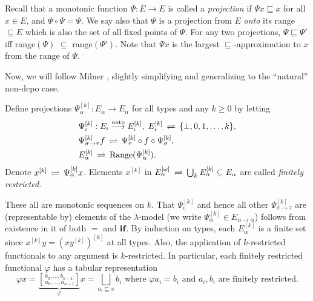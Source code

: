 \documentclass[fleqn]{LMCS}
\theoremstyle{plain}\newtheorem{satz}[thm]{Satz}
\theoremstyle{plain}\newtheorem{hyp}[thm]{Hypothesis}
\theoremstyle{plain}\newtheorem{hyps}[thm]{Hypotheses}
\theoremstyle{definition}\newtheorem{note}[thm]{Note}
\newcommand{\setof}[1]{\{#1\}}
\newcommand{\bYdef}{\mathrel{\BYDEF}}
\newcommand{\BYDEF}{\mbox{$\hspace{.2em}\rightleftharpoons\hspace{.2em}$}}
\newcommand{\arr}{\rightarrow}
\newcommand{\arrr}{\longrightarrow}
\newcommand{\IF}{\mbox{\bf if}}
\newcommand{\Undef}{{\perp}}
\newcommand{\?}{\mbox{?}}
\begin{document}
\bigskip

Recall that a monotonic function $\Psi:E\arr E$ 
is called a \emph{projection} 
if $\Psi x\sqsubseteq x$ for all $x\in E$, and  $\Psi\circ\Psi=\Psi$. 
We say also that $\Psi$ is a projection from $E$ \emph{onto} its range ${}\subseteq E$ 
which is also the set of all fixed points of $\Psi$. 
For any two projections, $\Psi\sqsubseteq\Psi'$ iff 
range$(\Psi)$ $\subseteq$ range$(\Psi')$. 
Note that 
$\Psi x$ is the largest $\sqsubseteq$-approximation to $x$ 
from the range of $\Psi$. 




\bigskip

\noindent
Now, we will follow Milner \cite{Milner77}, 
slightly simplifying and generalizing to the ``natural'' non-dcpo case. 

\begin{defi}\label{def:proj-finitely-restricted}Define projections 
$\Psi_\alpha ^{[k]} : E_\alpha \arr E_\alpha$ for all types and any $k\ge 0$ 
by letting
\begin{align*}\label{eq:proj}
&\Psi^{[k]}_{\iota}:E_\iota\stackrel{\rm onto}{\arrr} E_\iota^{[k]},\;
E_\iota^{[k]}\bYdef\setof{\Undef,0,1,\ldots,k}, 
\\
&\Psi^{[k]}_{\sigma\arr\tau}f\bYdef\Psi^{[k]}_{\tau}\circ f\circ\Psi^{[k]}_{\sigma}, 
\\
&E_\alpha^{[k]}\bYdef\textrm{Range}(\Psi^{[k]}_{\alpha}). 
\end{align*}
Denote $x^{[k]}\bYdef\Psi^{[k]}_{\alpha}x$. 
Elements $x^{[k]}$ in 
$E_\alpha^{[\omega]}\bYdef\bigcup_{k} E_\alpha^{[k]}\subseteq E_\alpha$ 
are called \emph{finitely restricted}. 
\end{defi}
\noindent
These all are monotonic sequences on $k$. 
That $\Psi^{[k]}_{\iota}$ and hence all other $\Psi^{[k]}_{\sigma\arr\tau}$ are 
(representable by) elements of the $\lambda$-model 
(we write $\Psi_\alpha ^{[k]} \in E_{\alpha \arr \alpha}$)
follows from existence in it of both $=$ and $\IF$. 
By induction on types, each $E_\alpha^{[k]}$ is a finite set 
since $x^{[k]} y = (x y^{[k]})^{[k]}$ at all types. 
Also, the application of $k$-restricted functionals to any argument is $k$-restricted. 
In particular, each finitely restricted functional  
$\varphi$ 
has a tabular representation
\begin{equation}
\label{eq:fin-main}
\varphi x =
		 \underbrace{\left[\,^{b_0,\ldots,b_{n-1}}
		 _{a_0,\ldots,a_{n-1}}\right]}_{\varphi}
		x
		=\bigsqcup_{a_i \sqsubseteq x} b_i
		\textrm{ where }\varphi a_i=b_i \textrm{ and } 
		a_i,b_i\textrm{ are finitely restricted}.  		
\end{equation}
\end{document}
